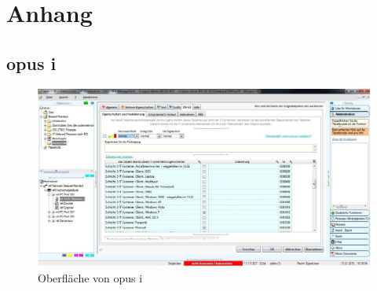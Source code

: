 \section{Anhang}
\begin{appendix}

\section{opus i}
\begin{figure}[H]
\label{opusiimage}
\includegraphics[scale=0.4]{images/opusi.jpg} 
\caption{Oberfläche von opus i}
\end{figure}

\end{appendix}